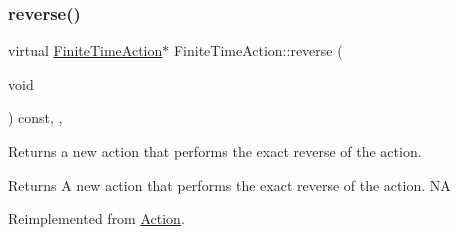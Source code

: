 \subsubsection{\texorpdfstring{reverse()}{reverse()}\hspace{0.1cm}{\footnotesize\ttfamily [1/2]}}
{\footnotesize\ttfamily virtual \hyperlink{classFiniteTimeAction}{Finite\+Time\+Action}$\ast$ Finite\+Time\+Action\+::reverse (\begin{DoxyParamCaption}\item[{void}]{ }\end{DoxyParamCaption}) const\hspace{0.3cm}{\ttfamily [inline]}, {\ttfamily [override]}, {\ttfamily [virtual]}}

Returns a new action that performs the exact reverse of the action.

\begin{DoxyReturn}{Returns}
A new action that performs the exact reverse of the action.  NA 
\end{DoxyReturn}


Reimplemented from \hyperlink{classAction_a2f06b574c4f066a3f11854a77c456227}{Action}.



